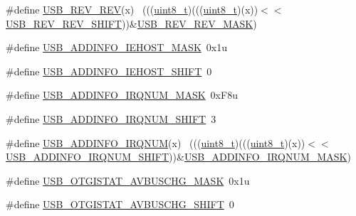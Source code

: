 \begin{DoxyCompactItemize}
\#define \hyperlink{group___u_s_b___register___masks_ga07d0c26b6db6e64d946e60bbd8879db0}{U\+S\+B\+\_\+\+R\+E\+V\+\_\+\+R\+EV}(x)                                                  ~(((\hyperlink{_p_e___types_8h_aba7bc1797add20fe3efdf37ced1182c5}{uint8\+\_\+t})(((\hyperlink{_p_e___types_8h_aba7bc1797add20fe3efdf37ced1182c5}{uint8\+\_\+t})(x))$<$$<$\hyperlink{group___u_s_b___register___masks_gab058ebe4be52454e46ef15ce015ac5fd}{U\+S\+B\+\_\+\+R\+E\+V\+\_\+\+R\+E\+V\+\_\+\+S\+H\+I\+FT}))\&\hyperlink{group___u_s_b___register___masks_ga72a356a066674e41e3827b0ccb931e71}{U\+S\+B\+\_\+\+R\+E\+V\+\_\+\+R\+E\+V\+\_\+\+M\+A\+SK})
\item 
\#define \hyperlink{group___u_s_b___register___masks_gacb7c792034c73c4861bc8fba6ff4314f}{U\+S\+B\+\_\+\+A\+D\+D\+I\+N\+F\+O\+\_\+\+I\+E\+H\+O\+S\+T\+\_\+\+M\+A\+SK}~0x1u
\item 
\#define \hyperlink{group___u_s_b___register___masks_gad256dcdfe8443877169b69dbcc8a041e}{U\+S\+B\+\_\+\+A\+D\+D\+I\+N\+F\+O\+\_\+\+I\+E\+H\+O\+S\+T\+\_\+\+S\+H\+I\+FT}~0
\item 
\#define \hyperlink{group___u_s_b___register___masks_gaa578584bfaf89e26213e6ba12e5f4b0e}{U\+S\+B\+\_\+\+A\+D\+D\+I\+N\+F\+O\+\_\+\+I\+R\+Q\+N\+U\+M\+\_\+\+M\+A\+SK}~0x\+F8u
\item 
\#define \hyperlink{group___u_s_b___register___masks_ga3332243caa9e2f9cfc49b031ac54cbda}{U\+S\+B\+\_\+\+A\+D\+D\+I\+N\+F\+O\+\_\+\+I\+R\+Q\+N\+U\+M\+\_\+\+S\+H\+I\+FT}~3
\item 
\#define \hyperlink{group___u_s_b___register___masks_ga1af2106db3477ecccb2d3b1c627c6da1}{U\+S\+B\+\_\+\+A\+D\+D\+I\+N\+F\+O\+\_\+\+I\+R\+Q\+N\+UM}(x)                                    ~(((\hyperlink{_p_e___types_8h_aba7bc1797add20fe3efdf37ced1182c5}{uint8\+\_\+t})(((\hyperlink{_p_e___types_8h_aba7bc1797add20fe3efdf37ced1182c5}{uint8\+\_\+t})(x))$<$$<$\hyperlink{group___u_s_b___register___masks_ga3332243caa9e2f9cfc49b031ac54cbda}{U\+S\+B\+\_\+\+A\+D\+D\+I\+N\+F\+O\+\_\+\+I\+R\+Q\+N\+U\+M\+\_\+\+S\+H\+I\+FT}))\&\hyperlink{group___u_s_b___register___masks_gaa578584bfaf89e26213e6ba12e5f4b0e}{U\+S\+B\+\_\+\+A\+D\+D\+I\+N\+F\+O\+\_\+\+I\+R\+Q\+N\+U\+M\+\_\+\+M\+A\+SK})
\item 
\#define \hyperlink{group___u_s_b___register___masks_ga4aed6ee50bdd46063aa551dfb6e91d80}{U\+S\+B\+\_\+\+O\+T\+G\+I\+S\+T\+A\+T\+\_\+\+A\+V\+B\+U\+S\+C\+H\+G\+\_\+\+M\+A\+SK}~0x1u
\item 
\#define \hyperlink{group___u_s_b___register___masks_ga0b762b08ffd3b747e2d0ad17b5f1641a}{U\+S\+B\+\_\+\+O\+T\+G\+I\+S\+T\+A\+T\+\_\+\+A\+V\+B\+U\+S\+C\+H\+G\+\_\+\+S\+H\+I\+FT}~0

\end{DoxyCompactItemize}
